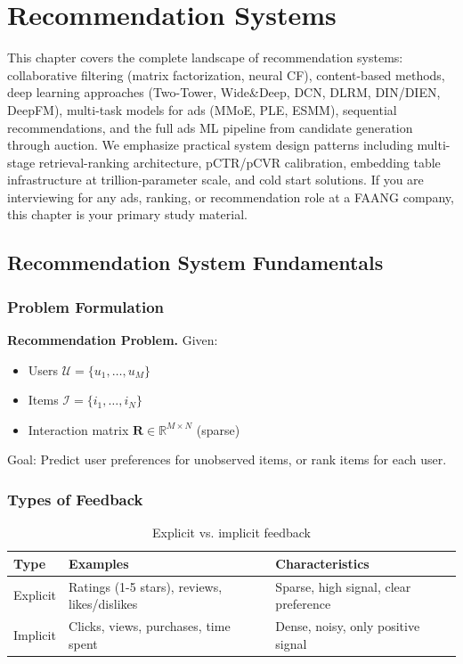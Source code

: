\chapter{Recommendation Systems}
\label{chap:recommendation}

\begin{tldr}
This chapter covers the complete landscape of recommendation systems: collaborative filtering (matrix factorization, neural CF), content-based methods, deep learning approaches (Two-Tower, Wide\&Deep, DCN, DLRM, DIN/DIEN, DeepFM), multi-task models for ads (MMoE, PLE, ESMM), sequential recommendations, and the full ads ML pipeline from candidate generation through auction. We emphasize practical system design patterns including multi-stage retrieval-ranking architecture, pCTR/pCVR calibration, embedding table infrastructure at trillion-parameter scale, and cold start solutions. If you are interviewing for any ads, ranking, or recommendation role at a FAANG company, this chapter is your primary study material.
\end{tldr}

\section{Recommendation System Fundamentals}
\label{sec:recsys_fundamentals}

\subsection{Problem Formulation}

\textbf{Recommendation Problem.} Given:
\begin{itemize}
    \item Users $\mathcal{U} = \{u_1, \ldots, u_M\}$
    \item Items $\mathcal{I} = \{i_1, \ldots, i_N\}$
    \item Interaction matrix $\mathbf{R} \in \mathbb{R}^{M \times N}$ (sparse)
\end{itemize}
Goal: Predict user preferences for unobserved items, or rank items for each user.

\subsection{Types of Feedback}

\begin{table}[H]
\centering
\caption{Explicit vs. implicit feedback}
\begin{tabularx}{\textwidth}{lXX}
\toprule
\textbf{Type} & \textbf{Examples} & \textbf{Characteristics} \\
\midrule
Explicit & Ratings (1-5 stars), reviews, likes/dislikes & Sparse, high signal, clear preference \\
Implicit & Clicks, views, purchases, time spent & Dense, noisy, only positive signal \\
\bottomrule
\end{tabularx}
\end{table}

